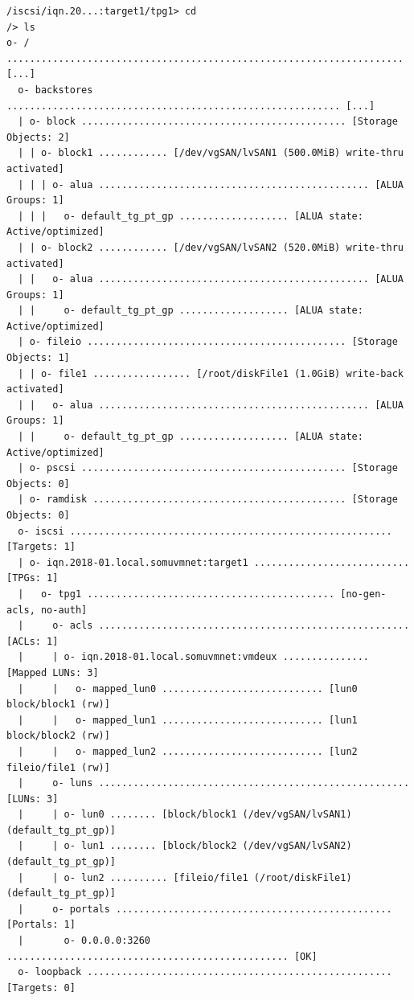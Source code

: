 \vspace{-15pt}
\begin{verbatim}
/iscsi/iqn.20...:target1/tpg1> cd
/> ls
o- / ..................................................................... [...]
  o- backstores .......................................................... [...]
  | o- block .............................................. [Storage Objects: 2]
  | | o- block1 ............ [/dev/vgSAN/lvSAN1 (500.0MiB) write-thru activated]
  | | | o- alua ............................................... [ALUA Groups: 1]
  | | |   o- default_tg_pt_gp ................... [ALUA state: Active/optimized]
  | | o- block2 ............ [/dev/vgSAN/lvSAN2 (520.0MiB) write-thru activated]
  | |   o- alua ............................................... [ALUA Groups: 1]
  | |     o- default_tg_pt_gp ................... [ALUA state: Active/optimized]
  | o- fileio ............................................. [Storage Objects: 1]
  | | o- file1 ................. [/root/diskFile1 (1.0GiB) write-back activated]
  | |   o- alua ............................................... [ALUA Groups: 1]
  | |     o- default_tg_pt_gp ................... [ALUA state: Active/optimized]
  | o- pscsi .............................................. [Storage Objects: 0]
  | o- ramdisk ............................................ [Storage Objects: 0]
  o- iscsi ........................................................ [Targets: 1]
  | o- iqn.2018-01.local.somuvmnet:target1 ........................... [TPGs: 1]
  |   o- tpg1 ........................................... [no-gen-acls, no-auth]
  |     o- acls ...................................................... [ACLs: 1]
  |     | o- iqn.2018-01.local.somuvmnet:vmdeux ............... [Mapped LUNs: 3]
  |     |   o- mapped_lun0 ............................ [lun0 block/block1 (rw)]
  |     |   o- mapped_lun1 ............................ [lun1 block/block2 (rw)]
  |     |   o- mapped_lun2 ............................ [lun2 fileio/file1 (rw)]
  |     o- luns ...................................................... [LUNs: 3]
  |     | o- lun0 ........ [block/block1 (/dev/vgSAN/lvSAN1) (default_tg_pt_gp)]
  |     | o- lun1 ........ [block/block2 (/dev/vgSAN/lvSAN2) (default_tg_pt_gp)]
  |     | o- lun2 .......... [fileio/file1 (/root/diskFile1) (default_tg_pt_gp)]
  |     o- portals ................................................ [Portals: 1]
  |       o- 0.0.0.0:3260 ................................................. [OK]
  o- loopback ..................................................... [Targets: 0]
\end{verbatim}
\vspace{-10pt}